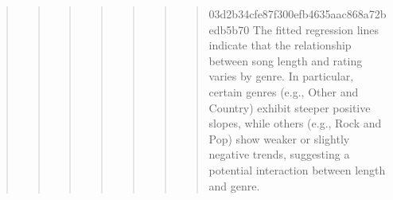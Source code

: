\documentclass[
]{article}
\begin{document}
\begin{quote}
\begin{quote}
\begin{quote}
\begin{quote}
\begin{quote}
\begin{quote}
\begin{quote}
03d2b34cfe87f300efb4635aac868a72bedb5b70 The fitted regression lines
indicate that the relationship between song length and rating varies by
genre. In particular, certain genres (e.g., Other and Country) exhibit
steeper positive slopes, while others (e.g., Rock and Pop) show weaker
or slightly negative trends, suggesting a potential interaction between
length and genre.
\end{quote}
\end{quote}
\end{quote}
\end{quote}
\end{quote}
\end{quote}
\end{quote}
\end{document}

